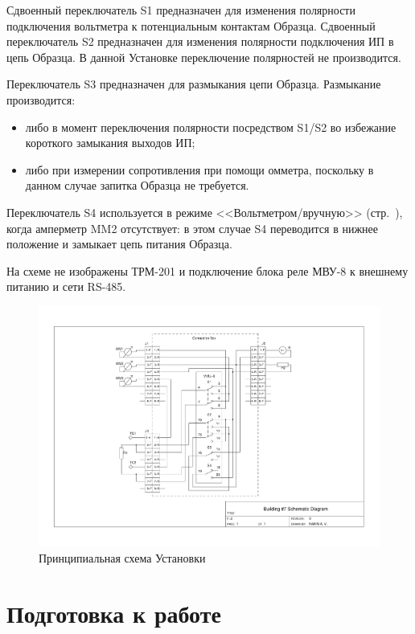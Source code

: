 \documentclass[12pt, a4paper, twocolumn]{report}
\begin{document}
Сдвоенный переключатель S1 предназначен для изменения полярности подключения вольтметра к потенциальным контактам Образца. Сдвоенный переключатель S2 предназначен для изменения полярности подключения ИП в цепь Образца. В данной Установке переключение полярностей не производится.

Переключатель S3 предназначен для размыкания цепи Образца. Размыкание производится:

\begin{itemize}
\item либо в момент переключения полярности посредством S1/S2 во избежание короткого замыкания выходов ИП;
\item либо при измерении сопротивления при помощи омметра, поскольку в данном случае запитка Образца не требуется.
\end{itemize}

Переключатель S4 используется в режиме <<Вольтметром/вручную>> (стр.~\pageref{sec_voltmeter_manually}), когда амперметр MM2 отсутствует: в этом случае S4 переводится в нижнее положение и замыкает цепь питания Образца.

На схеме не изображены ТРМ-201 и подключение блока реле МВУ-8 к внешнему питанию и сети RS-485.

\begin{figure}
\begin{center}
\includegraphics[width=1.0\textwidth, clip, viewport=190 120 630 530]{scheme}
\end{center}
\caption{Принципиальная схема Установки}
\label{pic-scheme}
\end{figure}

\chapter{Подготовка к работе}
\end{document}
